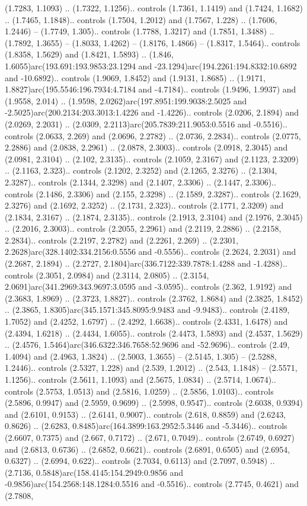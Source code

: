 (1.7283, 1.1093) .. (1.7322, 1.1256).. controls (1.7361, 1.1419) and (1.7424, 1.1682) .. (1.7465, 1.1848).. controls (1.7504, 1.2012) and (1.7567, 1.228) .. (1.7606, 1.2446) -- (1.7749, 1.305).. controls (1.7788, 1.3217) and (1.7851, 1.3488) .. (1.7892, 1.3655) -- (1.8033, 1.4262) -- (1.8176, 1.4866) -- (1.8317, 1.5464).. controls (1.8358, 1.5629) and (1.8421, 1.5893) .. (1.846, 1.6055)arc(193.691:193.9853:23.1294 and -23.1294)arc(194.2261:194.8332:10.6892 and -10.6892).. controls (1.9069, 1.8452) and (1.9131, 1.8685) .. (1.9171, 1.8827)arc(195.5546:196.7934:4.7184 and -4.7184).. controls (1.9496, 1.9937) and (1.9558, 2.014) .. (1.9598, 2.0262)arc(197.8951:199.9038:2.5025 and -2.5025)arc(200.2134:203.3013:1.4226 and -1.4226).. controls (2.0206, 2.1894) and (2.0269, 2.2031) .. (2.0309, 2.2113)arc(205.7839:211.9053:0.5516 and -0.5516).. controls (2.0633, 2.269) and (2.0696, 2.2782) .. (2.0736, 2.2834).. controls (2.0775, 2.2886) and (2.0838, 2.2961) .. (2.0878, 2.3003).. controls (2.0918, 2.3045) and (2.0981, 2.3104) .. (2.102, 2.3135).. controls (2.1059, 2.3167) and (2.1123, 2.3209) .. (2.1163, 2.323).. controls (2.1202, 2.3252) and (2.1265, 2.3276) .. (2.1304, 2.3287).. controls (2.1344, 2.3298) and (2.1407, 2.3306) .. (2.1447, 2.3306).. controls (2.1486, 2.3306) and (2.155, 2.3298) .. (2.1589, 2.3287).. controls (2.1629, 2.3276) and (2.1692, 2.3252) .. (2.1731, 2.323).. controls (2.1771, 2.3209) and (2.1834, 2.3167) .. (2.1874, 2.3135).. controls (2.1913, 2.3104) and (2.1976, 2.3045) .. (2.2016, 2.3003).. controls (2.2055, 2.2961) and (2.2119, 2.2886) .. (2.2158, 2.2834).. controls (2.2197, 2.2782) and (2.2261, 2.269) .. (2.2301, 2.2628)arc(328.1402:334.2156:0.5556 and -0.5556).. controls (2.2624, 2.2031) and (2.2687, 2.1894) .. (2.2727, 2.1804)arc(336.7122:339.7878:1.4288 and -1.4288).. controls (2.3051, 2.0984) and (2.3114, 2.0805) .. (2.3154, 2.0691)arc(341.2969:343.9697:3.0595 and -3.0595).. controls (2.362, 1.9192) and (2.3683, 1.8969) .. (2.3723, 1.8827).. controls (2.3762, 1.8684) and (2.3825, 1.8452) .. (2.3865, 1.8305)arc(345.1571:345.8095:9.9483 and -9.9483).. controls (2.4189, 1.7052) and (2.4252, 1.6797) .. (2.4292, 1.6638).. controls (2.4331, 1.6478) and (2.4394, 1.6218) .. (2.4434, 1.6055).. controls (2.4473, 1.5893) and (2.4537, 1.5629) .. (2.4576, 1.5464)arc(346.6322:346.7658:52.9696 and -52.9696).. controls (2.49, 1.4094) and (2.4963, 1.3824) .. (2.5003, 1.3655) -- (2.5145, 1.305) -- (2.5288, 1.2446).. controls (2.5327, 1.228) and (2.539, 1.2012) .. (2.543, 1.1848) -- (2.5571, 1.1256).. controls (2.5611, 1.1093) and (2.5675, 1.0834) .. (2.5714, 1.0674).. controls (2.5753, 1.0513) and (2.5816, 1.0259) .. (2.5856, 1.0103).. controls (2.5896, 0.9947) and (2.5959, 0.9699) .. (2.5998, 0.9547).. controls (2.6038, 0.9394) and (2.6101, 0.9153) .. (2.6141, 0.9007).. controls (2.618, 0.8859) and (2.6243, 0.8626) .. (2.6283, 0.8485)arc(164.3899:163.2952:5.3446 and -5.3446).. controls (2.6607, 0.7375) and (2.667, 0.7172) .. (2.671, 0.7049).. controls (2.6749, 0.6927) and (2.6813, 0.6736) .. (2.6852, 0.6621).. controls (2.6891, 0.6505) and (2.6954, 0.6327) .. (2.6994, 0.622).. controls (2.7034, 0.6113) and (2.7097, 0.5948) .. (2.7136, 0.5848)arc(158.4145:154.2949:0.9856 and -0.9856)arc(154.2568:148.1284:0.5516 and -0.5516).. controls (2.7745, 0.4621) and (2.7808, 